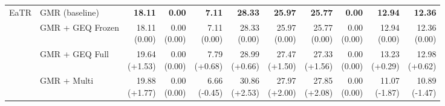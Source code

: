 \documentclass{article}
\begin{document}
{\begin{tabular}{llrrrrrrrrr}
\midrule
EaTR & GMR (baseline) & \textbf{18.11} & \textbf{0.00} & \textbf{7.11} & \textbf{28.33} & \textbf{25.97} & \textbf{25.77} & \textbf{0.00} & \textbf{12.94} & \textbf{12.36} \\
 & GMR + GEQ Frozen & \shortstack{18.11 \\ {\scriptsize\textcolor{Zero}{(0.00)}}} & \shortstack{0.00 \\ {\scriptsize\textcolor{Zero}{(0.00)}}} & \shortstack{7.11 \\ {\scriptsize\textcolor{Zero}{(0.00)}}} & \shortstack{28.33 \\ {\scriptsize\textcolor{Zero}{(0.00)}}} & \shortstack{25.97 \\ {\scriptsize\textcolor{Zero}{(0.00)}}} & \shortstack{25.77 \\ {\scriptsize\textcolor{Zero}{(0.00)}}} & \shortstack{0.00 \\ {\scriptsize\textcolor{Zero}{(0.00)}}} & \shortstack{12.94 \\ {\scriptsize\textcolor{Zero}{(0.00)}}} & \shortstack{12.36 \\ {\scriptsize\textcolor{Zero}{(0.00)}}} \\
 & GMR + GEQ Full & \shortstack{19.64 \\ {\scriptsize\textcolor{Gain}{(+1.53)}}} & \shortstack{0.00 \\ {\scriptsize\textcolor{Zero}{(0.00)}}} & \shortstack{7.79 \\ {\scriptsize\textcolor{Gain}{(+0.68)}}} & \shortstack{28.99 \\ {\scriptsize\textcolor{Gain}{(+0.66)}}} & \shortstack{27.47 \\ {\scriptsize\textcolor{Gain}{(+1.50)}}} & \shortstack{27.33 \\ {\scriptsize\textcolor{Gain}{(+1.56)}}} & \shortstack{0.00 \\ {\scriptsize\textcolor{Zero}{(0.00)}}} & \shortstack{13.23 \\ {\scriptsize\textcolor{Gain}{(+0.29)}}} & \shortstack{12.98 \\ {\scriptsize\textcolor{Gain}{(+0.62)}}} \\
 & GMR + Multi & \shortstack{19.88 \\ {\scriptsize\textcolor{Gain}{(+1.77)}}} & \shortstack{0.00 \\ {\scriptsize\textcolor{Zero}{(0.00)}}} & \shortstack{6.66 \\ {\scriptsize\textcolor{Loss}{(-0.45)}}} & \shortstack{30.86 \\ {\scriptsize\textcolor{Gain}{(+2.53)}}} & \shortstack{27.97 \\ {\scriptsize\textcolor{Gain}{(+2.00)}}} & \shortstack{27.85 \\ {\scriptsize\textcolor{Gain}{(+2.08)}}} & \shortstack{0.00 \\ {\scriptsize\textcolor{Zero}{(0.00)}}} & \shortstack{11.07 \\ {\scriptsize\textcolor{Loss}{(-1.87)}}} & \shortstack{10.89 \\ {\scriptsize\textcolor{Loss}{(-1.47)}}} \\

\end{tabular}}
\end{document}
